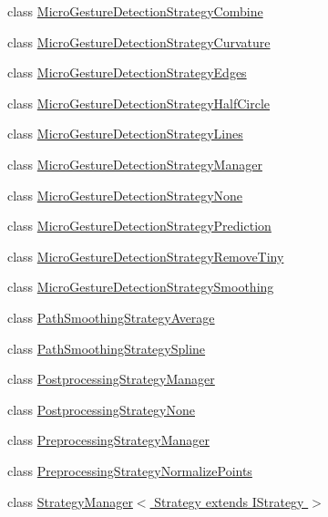 \begin{DoxyCompactItemize}
class \hyperlink{classch_1_1zhaw_1_1ba10__bsha__1_1_1strategies_1_1MicroGestureDetectionStrategyCombine}{MicroGestureDetectionStrategyCombine}
\item 
class \hyperlink{classch_1_1zhaw_1_1ba10__bsha__1_1_1strategies_1_1MicroGestureDetectionStrategyCurvature}{MicroGestureDetectionStrategyCurvature}
\item 
class \hyperlink{classch_1_1zhaw_1_1ba10__bsha__1_1_1strategies_1_1MicroGestureDetectionStrategyEdges}{MicroGestureDetectionStrategyEdges}
\item 
class \hyperlink{classch_1_1zhaw_1_1ba10__bsha__1_1_1strategies_1_1MicroGestureDetectionStrategyHalfCircle}{MicroGestureDetectionStrategyHalfCircle}
\item 
class \hyperlink{classch_1_1zhaw_1_1ba10__bsha__1_1_1strategies_1_1MicroGestureDetectionStrategyLines}{MicroGestureDetectionStrategyLines}
\item 
class \hyperlink{classch_1_1zhaw_1_1ba10__bsha__1_1_1strategies_1_1MicroGestureDetectionStrategyManager}{MicroGestureDetectionStrategyManager}
\item 
class \hyperlink{classch_1_1zhaw_1_1ba10__bsha__1_1_1strategies_1_1MicroGestureDetectionStrategyNone}{MicroGestureDetectionStrategyNone}
\item 
class \hyperlink{classch_1_1zhaw_1_1ba10__bsha__1_1_1strategies_1_1MicroGestureDetectionStrategyPrediction}{MicroGestureDetectionStrategyPrediction}
\item 
class \hyperlink{classch_1_1zhaw_1_1ba10__bsha__1_1_1strategies_1_1MicroGestureDetectionStrategyRemoveTiny}{MicroGestureDetectionStrategyRemoveTiny}
\item 
class \hyperlink{classch_1_1zhaw_1_1ba10__bsha__1_1_1strategies_1_1MicroGestureDetectionStrategySmoothing}{MicroGestureDetectionStrategySmoothing}
\item 
class \hyperlink{classch_1_1zhaw_1_1ba10__bsha__1_1_1strategies_1_1PathSmoothingStrategyAverage}{PathSmoothingStrategyAverage}
\item 
class \hyperlink{classch_1_1zhaw_1_1ba10__bsha__1_1_1strategies_1_1PathSmoothingStrategySpline}{PathSmoothingStrategySpline}
\item 
class \hyperlink{classch_1_1zhaw_1_1ba10__bsha__1_1_1strategies_1_1PostprocessingStrategyManager}{PostprocessingStrategyManager}
\item 
class \hyperlink{classch_1_1zhaw_1_1ba10__bsha__1_1_1strategies_1_1PostprocessingStrategyNone}{PostprocessingStrategyNone}
\item 
class \hyperlink{classch_1_1zhaw_1_1ba10__bsha__1_1_1strategies_1_1PreprocessingStrategyManager}{PreprocessingStrategyManager}
\item 
class \hyperlink{classch_1_1zhaw_1_1ba10__bsha__1_1_1strategies_1_1PreprocessingStrategyNormalizePoints}{PreprocessingStrategyNormalizePoints}
\item 
class \hyperlink{classch_1_1zhaw_1_1ba10__bsha__1_1_1strategies_1_1StrategyManager_3_01Strategy_01extends_01IStrategy_01_4}{StrategyManager$<$ Strategy extends IStrategy $>$}
\end{DoxyCompactItemize}
